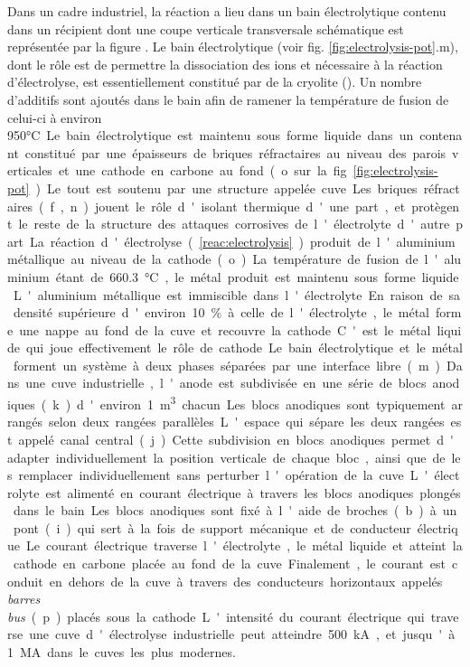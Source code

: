 Dans un cadre industriel, la réaction a lieu dans un bain
électrolytique contenu dans un récipient dont une coupe verticale
transversale schématique est représentée par la figure
. Le bain électrolytique (voir
fig. \ref{fig:electrolysis-pot}.m), dont le rôle est de permettre la
dissociation des ions  et  nécessaire à la
réaction d'électrolyse, est essentiellement constitué par de la
cryolite (). Un nombre d'additifs sont ajoutés dans le
bain afin de ramener la température de fusion de celui-ci à environ
\num{950}\si\celsius.

Le bain électrolytique est maintenu sous forme liquide dans un
contenant constitué par une épaisseurs de briques réfractaires au
niveau des parois verticales et une cathode en carbone au fond (o. sur
la fig. \ref{fig:electrolysis-pot}). Le tout est soutenu par une
structure appelée cuve. Les briques réfractaires (f., n.) jouent le rôle
d'isolant thermique d'une part, et protègent le reste de la structure
des attaques corrosives de l'électrolyte d'autre part.

La réaction d'électrolyse (\ref{reac:electrolysis}) produit de
l'aluminium métallique au niveau de la cathode (o.). La température de
fusion de l'aluminium étant de \num{660.3}\si{\celsius}, le métal
produit est maintenu sous forme liquide. L'aluminium métallique est
immiscible dans l'électrolyte. En raison de sa densité supérieure
d'environ \num{10}\% à celle de l'électrolyte, le métal forme une
nappe au fond de la cuve et recouvre la cathode. C'est le métal
liquide qui joue effectivement le rôle de cathode. Le bain
électrolytique et le métal forment un système à deux phases séparées
par une interface libre (m.).

Dans une cuve industrielle, l'anode est subdivisée en une série de
blocs anodiques (k.) d'environ \num{1}\si{\cubic\meter} chacun. Les blocs
anodiques sont typiquement arrangés selon deux rangées
parallèles. L'espace qui sépare les deux rangées est appelé canal
central (j.). Cette subdivision en blocs anodiques permet d'adapter
individuellement la position verticale de chaque bloc, ainsi que de
les remplacer individuellement sans perturber l'opération de la cuve.

L'électrolyte est alimenté en courant électrique à travers les blocs
anodiques plongés dans le bain. Les blocs anodiques sont fixé à l'aide
de broches (b.) à un pont (i.) qui sert à la fois de support mécanique
et de conducteur électrique. Le courant électrique traverse
l'électrolyte, le métal liquide et atteint la cathode en carbone
placée au fond de la cuve. Finalement, le courant est conduit en
dehors de la cuve à travers des conducteurs horizontaux appelés {\em
  barres bus} (p.) placés sous la cathode. L'intensité du courant
électrique qui traverse une cuve d'électrolyse industrielle peut
atteindre \num{500}\si{\kilo\ampere}, et jusqu'à
\num{1}\si{\mega\ampere} dans le cuves les plus modernes.

